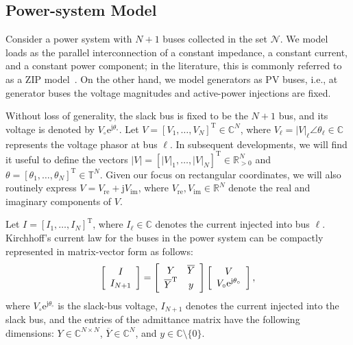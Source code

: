 \documentclass[10 pt, conference]{ieeeconf}
\begin{document}
\subsection{Power-system Model}
Consider a power system with $N+1$ buses collected in the set $\mathcal{N}$. We model loads as the parallel interconnection of a constant impedance, a constant current, and a constant power component; in the literature, this is commonly referred to as a $\mathrm{ZIP}$ model~\cite{price1993load}. On the other hand, we model generators as $\mathrm{PV}$ buses, i.e., at generator buses the voltage magnitudes and active-power injections are fixed.

Without loss of generality, the slack bus is fixed to be the $N+1$ bus, and its voltage is denoted by $V_\circ \mathrm{e}^{\mathrm j \theta_\circ}$. Let $V = [V_1, \dots, V_{N}]^\mathrm{T} \in \mathbb{C}^N$, where $V_\ell = |V|_\ell \angle \theta_\ell \in \mathbb{C}$ represents the voltage phasor at bus $\ell$. In subsequent developments, we will find it useful to define the vectors $|V| = [|V|_1,\dots,|V|_N]^\mathrm T \in \mathbb{R}^N_{>0}$ and $\theta = [\theta_1,\dots,\theta_N]^\mathrm T \in \mathbb{T}^N$. Given our focus on rectangular coordinates, we will also routinely express $V = V _\mathrm{re} + \mathrm j V_\mathrm{im}$, where $V_\mathrm{re}, V_\mathrm{im} \in \mathbb{R}^N$ denote the real and imaginary components of $V$.

Let $I = [I_1, \dots, I_{N}]^\mathrm{T}$, where $I_\ell \in \mathbb{C}$ denotes the current injected into bus $\ell$.  Kirchhoff's current law for the buses in the power system can be compactly represented in matrix-vector form as follows:
\begin{equation}
\left[ \begin{array}{c} I  \\  I_{N+1} \end{array} \right] = \left[ \begin{array}{c c} Y & \overline{Y}\\ \overline{Y}^{\mathrm T}  & y  \end{array} \right] \left[ \begin{array}{c} V \\ V_\circ \mathrm e^{\mathrm j \theta_\circ} \end{array} \right],
\label{eq:Ii}
\end{equation}
where $V_\circ \mathrm e^{\mathrm j \theta_\circ}$ is the slack-bus voltage, $I_{N+1}$ denotes the current injected into the slack bus, and the entries of the admittance matrix have the following dimensions: $Y \in \mathbb{C}^{N\times N}$, $\overline Y \in \mathbb{C}^{N}$, and $y \in \mathbb{C} \setminus \{0\}$. 
\end{document}
